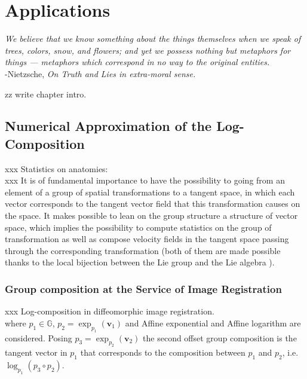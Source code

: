 \chapter{Applications}\label{ch:applications}

\begin{flushright}
	\emph{We believe that we know something about the things themselves when we speak of trees, colors, snow, and flowers; and yet we possess nothing but metaphors for things — metaphors which correspond in no way to the original entities.} \\ -Nietzsche, \emph{On Truth and Lies in extra-moral sense.}
\end{flushright}

zz write chapter intro.


\section{Numerical Approximation of the Log-Composition}\label{ch:application_log_composition}




xxx Statistics on anatomies: \\
xxx It is of fundamental importance to have the possibility to going from an element of a group of spatial transformations  to a tangent space, in which each vector corresponds to the tangent vector field that this transformation causes on the space. It makes possible to lean on the group structure a structure of vector space, which implies the possibility to compute statistics on the group of transformation as well as compose velocity fields in the tangent space passing through the corresponding transformation (both of them are made possible thanks to the local bijection between the Lie group and the Lie algebra ). \\

\subsection{Group composition at the Service of Image Registration}

xxx Log-composition in diffeomorphic image registration.\\


where $p_1 \in \mathbb{G}$, $p_2 = \exp_{p_1}(\mathbf{v}_{1})$ and Affine exponential and Affine logarithm are considered. Posing $p_3 = \exp_{p_2}(\mathbf{v}_{2})$ the second offset group composition is the tangent vector in $p_1$ that corresponds to the composition between $p_1$ and $p_2$, i.e. $\log_{p_1}(p_3 \circ p_2)$. \\


